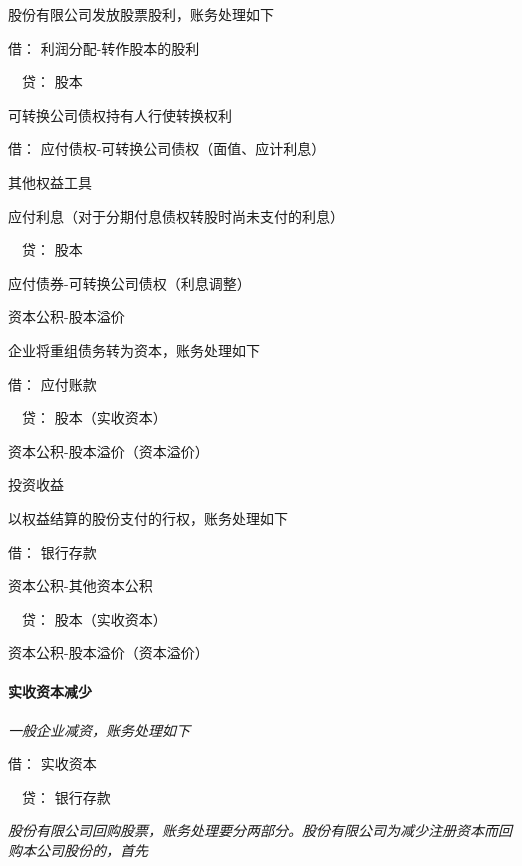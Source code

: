 \documentclass[UTF8,12pt]{ctexart}
\newenvironment{Dr}{\noindent 借：}{\par}
\newenvironment{Cr}{\noindent \ \ 贷：}{\par}
\numberwithin{equation}{section} %
\numberwithin{figure}{section}
\numberwithin{table}{section}
\begin{document}
	股份有限公司发放股票股利，账务处理如下
	
	\begin{Dr}
		利润分配-转作股本的股利
	\end{Dr}
	\begin{Cr}
		股本
	\end{Cr}
	
	可转换公司债权持有人行使转换权利
	
	\begin{Dr}
		应付债权-可转换公司债权（面值、应计利息）
		
		其他权益工具
		
		应付利息（对于分期付息债权转股时尚未支付的利息）
	\end{Dr}
	\begin{Cr}
		股本
		
		应付债券-可转换公司债权（利息调整）
		
		资本公积-股本溢价
	\end{Cr}

	企业将重组债务转为资本，账务处理如下
	
	\begin{Dr}
		应付账款
	\end{Dr}
	\begin{Cr}
		股本（实收资本）
		
		资本公积-股本溢价（资本溢价）
		
		投资收益
	\end{Cr}

	以权益结算的股份支付的行权，账务处理如下
	
	\begin{Dr}
		银行存款
		
		资本公积-其他资本公积
	\end{Dr}
	\begin{Cr}
		股本（实收资本）
		
		资本公积-股本溢价（资本溢价）
	\end{Cr}

	\paragraph{实收资本减少}
	\textit{一般企业减资，账务处理如下}
	
	\begin{Dr}
		实收资本
	\end{Dr}
	\begin{Cr}
		银行存款
	\end{Cr}

	\textit{股份有限公司回购股票，账务处理要分两部分。股份有限公司为减少注册资本而回购本公司股份的，首先}
	
\end{document}

